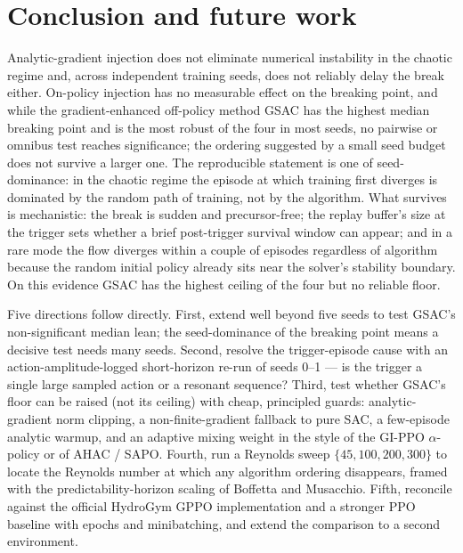 \section{Conclusion and future work}
\label{sec:conclusion}

Analytic-gradient injection does not eliminate numerical instability in the
chaotic regime and, across independent training seeds, does not reliably
delay the break either. On-policy injection has no measurable effect on the
breaking point, and while the gradient-enhanced off-policy method GSAC has
the highest median breaking point and is the most robust of the four in most
seeds, no pairwise or omnibus test reaches significance; the ordering
suggested by a small seed budget does not survive a larger one. The
reproducible statement is one of seed-dominance: in the chaotic regime the
episode at which training first diverges is dominated by the random path of
training, not by the algorithm. What survives is mechanistic: the break is
sudden and precursor-free; the replay buffer's size at the trigger sets
whether a brief post-trigger survival window can appear; and in a rare mode
the flow diverges within a couple of episodes regardless of algorithm because
the random initial policy already sits near the solver's stability boundary.
On this evidence GSAC has the highest ceiling of the four but no reliable
floor.

Five directions follow directly. First, extend well beyond five seeds to
test GSAC's non-significant median lean; the seed-dominance of the breaking
point means a decisive test needs many seeds. Second, resolve the
trigger-episode cause with an action-amplitude-logged short-horizon re-run of
seeds 0--1 --- is the trigger a single large sampled action or a resonant
sequence? Third, test whether GSAC's floor can be raised (not its ceiling)
with cheap, principled guards: analytic-gradient norm clipping, a
non-finite-gradient fallback to pure SAC, a few-episode analytic warmup, and
an adaptive mixing weight in the style of the GI-PPO $\alpha$-policy or of
AHAC / SAPO. Fourth, run a Reynolds sweep $\{45,100,200,300\}$ to locate the
Reynolds number at which any algorithm ordering disappears, framed with the
predictability-horizon scaling of Boffetta and Musacchio. Fifth, reconcile
against the official HydroGym GPPO implementation and a stronger PPO baseline
with epochs and minibatching, and extend the comparison to a second
environment.
